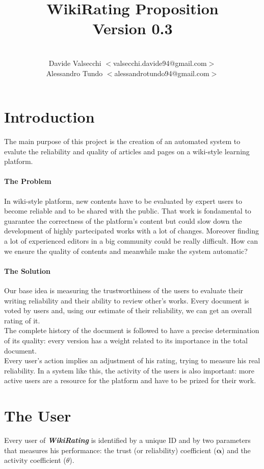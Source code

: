 \documentclass[a4paper,11pt]{article}
\title{\textbf{WikiRating Proposition\\Version 0.3}}
\author{\\Davide Valsecchi $<$valsecchi.davide94@gmail.com$>$
\\Alessandro Tundo  $<$alessandrotundo94@gmail.com$>$ }
\newcommand{\wir}{\textbf{\textit{WikiRating }}}
\begin{document}
\maketitle
\newpage
\tableofcontents
\newpage

\section{Introduction}

The main purpose of this project is the creation of an automated system to evalute the reliability and quality of articles and pages on a wiki-style learning platform.
\paragraph{The Problem}
In wiki-style platform, new contents have to be evaluated by expert users to become reliable and to be shared with the public. That work is fondamental to guarantee the
correctness of the platform's content but could slow down the development of highly
partecipated works with a lot of changes. Moreover finding a lot of experienced editors  
in a big community could be really difficult. How can we ensure the quality of contents 
and meanwhile make the system automatic?
\paragraph{The Solution}
Our base idea is measuring the trustworthiness of the users to evaluate their writing reliability and their ability to review other's works. Every document is voted by users and, using our estimate of their reliability, we can get an overall rating of it. 
\\The complete history of the document is followed to have a precise determination of its quality: every version has a weight related to its importance in the total document. 
\\Every user's action implies an adjustment of his rating, trying to measure his real reliability. In a system like this, the activity of the users is also important: more active users are a resource for the platform and have to be prized for their work.

\newpage
\section{The User} \label{sec:user}
Every user of \wir is identified by a unique ID and by two parameters that measures his performance: the trust (or reliability) coefficient ($\mathbf{\alpha}$) and the activity coefficient ($\theta$).
\end{document}
